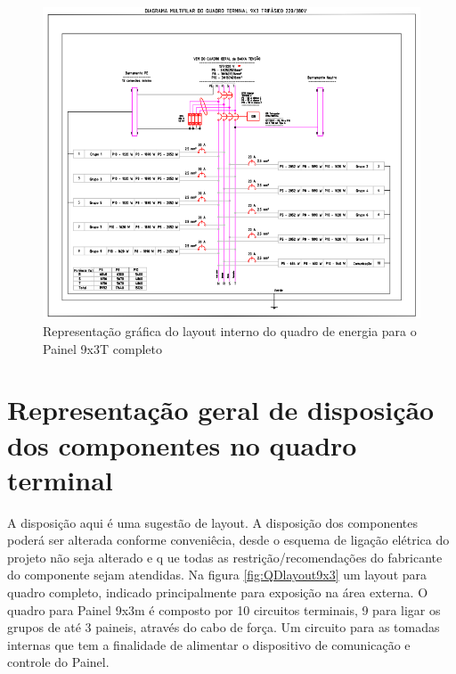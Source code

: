 \begin{figure}[h]
    \centering
    \includegraphics[width=\textwidth]{image/multi9x3t380.png}
    \caption{Representação gráfica do layout interno do quadro de energia para o Painel 9x3T completo}
   \label{fig:QDTmult9x3t380}
\end{figure}




\section{Representação geral de disposição dos componentes no quadro terminal}
A disposição aqui é uma sugestão de layout. A disposição dos componentes poderá ser alterada conforme conveniêcia, desde o esquema de ligação elétrica do projeto não seja alterado e q ue todas as restrição/recomendações do fabricante do componente sejam atendidas.
Na figura \ref{fig:QDlayout9x3} um layout para quadro completo, indicado principalmente para exposição na área externa. 
O quadro para Painel 9x3m é composto por 10 circuitos terminais, 9 para ligar os grupos de até 3 paineis, através do cabo de força. Um circuito para as tomadas internas que tem a finalidade de alimentar o dispositivo de comunicação e controle do Painel.

